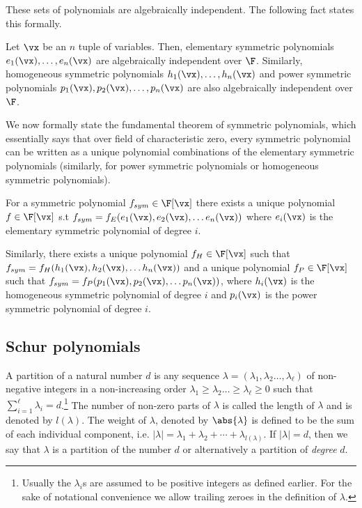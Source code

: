 These sets of polynomials are algebraically independent. The following fact states this formally. 
\begin{fact}\label{fact:sym ad}
Let $\vx$ be an $n$ tuple of variables. Then, elementary symmetric polynomials $e_1(\vx), \ldots, e_n(\vx)$   are algebraically independent over $\F$. Similarly,  homogeneous symmetric polynomials $h_1(\vx), \ldots, h_n(\vx)$ and power symmetric polynomials $p_1(\vx), p_2(\vx), \ldots, p_n(\vx)$ are also algebraically independent over $\F$. 
\end{fact}

%

We now formally state the fundamental theorem of symmetric polynomials, which essentially says that over field of characteristic zero, every symmetric polynomial can be written as a unique polynomial combinations of the elementary symmetric polynomials (similarly, for power symmetric polynomials or homogeneous symmetric polynomials).
\begin{theorem}
\label{thm:fundamental}
For a symmetric polynomial $f_{sym} \in \F[\vx]$ there exists a unique polynomial $f \in \F[\vx]$ s.t $f_{sym}=f_E(e_1(\vx),e_2(\vx), \ldots e_n(\vx))$ where $e_i(\vx)$ is the elementary symmetric polynomial of degree $i$. 
 
Similarly, there exists a unique polynomial $f_H \in \F[\vx]$ such that $f_{sym} =f_H(h_1(\vx),h_2(\vx), \ldots h_n(\vx))$ and a unique polynomial $f_P \in \F[\vx]$ such that $f_{sym} =f_P(p_1(\vx),p_2(\vx), \ldots p_n(\vx))$, where $h_i(\vx)$ is the homogeneous symmetric polynomial of degree $i$ and $p_i(\vx)$ is the power symmetric polynomial of degree $i$. 
\end{theorem} 

\subsection{Schur polynomials}
\label{sec:prelim-schur}
A partition of a natural number $d$ is any sequence $\lambda = (\lambda_1,\lambda_2 \ldots, \lambda_{\ell} )$ of non-negative integers in a non-increasing order $\lambda_1 \geq \lambda_2 \ldots \geq  \lambda_{\ell} \geq 0$ such that $\sum_{i = 1}^{\ell} \lambda_i = d$.\footnote{Usually the $\lambda_i$s are assumed to be positive integers as defined earlier. For the sake of notational convenience we allow trailing zeroes in the definition of $\lambda$.}
The number of non-zero parts of $\lambda$ is called the length of $\lambda$ and is denoted by $l(\lambda)$. The weight of $\lambda$, denoted by $\abs{\lambda}$ is defined to be the sum of each individual component, i.e. $|\lambda|=\lambda_1 +
\lambda_2+ \cdots + \lambda_{l(\lambda)}$. If $|\lambda|=d$, then we say that $\lambda$ is a partition of the number $d$ or alternatively a partition of \emph{degree} $d$.  


